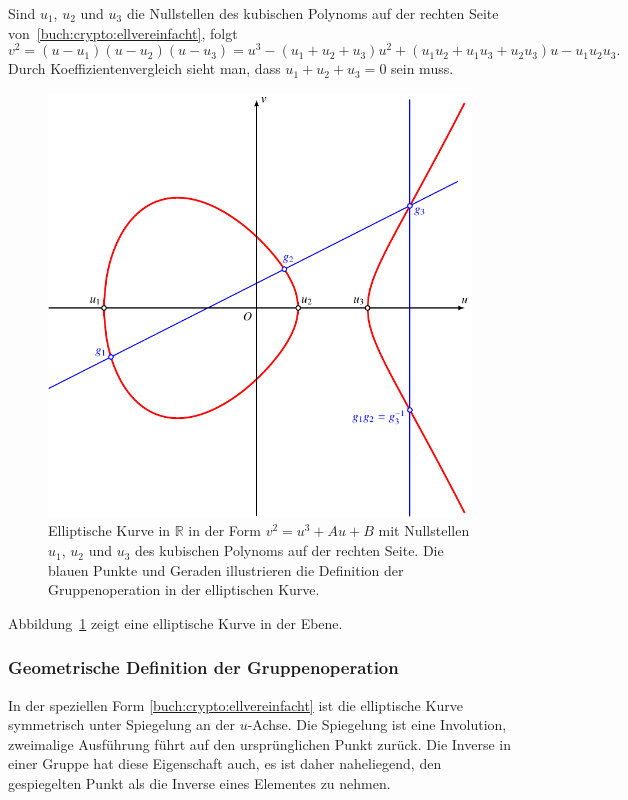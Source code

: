 Sind $u_1$, $u_2$ und $u_3$ die Nullstellen des kubischen Polynoms
auf der rechten Seite von~\eqref{buch:crypto:ellvereinfacht}, folgt
\[
v^2
=
(u-u_1)(u-u_2)(u-u_3)
=
u^3
-(u_1+u_2+u_3)u^2
+(u_1u_2+u_1u_3+u_2u_3)u
-
u_1u_2u_3.
\]
Durch Koeffizientenvergleich sieht man, dass $u_1+u_2+u_3=0$ sein muss.
\begin{figure}
\centering
\includegraphics{chapters/90-crypto/images/elliptic.pdf}
\caption{Elliptische Kurve in $\mathbb{R}$ in der Form
$v^2=u^3+Au+B$ mit Nullstellen $u_1$, $u_2$ und $u_3$ des
kubischen Polynoms auf der rechten Seite.
Die blauen Punkte und Geraden illustrieren die Definition der
Gruppenoperation in der elliptischen Kurve.
\label{buch:crypto:fig:elliptischekurve}}
\end{figure}
Abbildung~\ref{buch:crypto:fig:elliptischekurve}
zeigt eine elliptische Kurve in der Ebene.

\subsubsection{Geometrische Definition der Gruppenoperation}
In der speziellen Form \ref{buch:crypto:ellvereinfacht} ist die
elliptische Kurve symmetrisch unter Spiegelung an der $u$-Achse.
Die Spiegelung ist eine Involution, zweimalige Ausführung führt auf
den ursprünglichen Punkt zurück.
Die Inverse in einer Gruppe hat diese Eigenschaft auch, es ist
daher naheliegend, den gespiegelten Punkt als die Inverse eines
Elementes zu nehmen.

